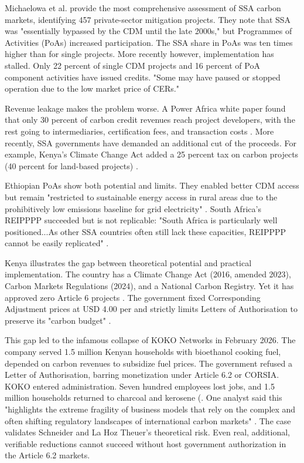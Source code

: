 Michaelowa et al. \cite{michaelowa-mobilising} provide the most comprehensive assessment of SSA carbon markets, identifying 457 private-sector mitigation projects. They note that SSA was "essentially bypassed by the CDM until the late 2000s," but Programmes of Activities (PoAs) increased participation. The SSA share in PoAs was ten times higher than for single projects. More recently however, implementation has stalled. Only 22 percent of single CDM projects and 16 percent of PoA component activities have issued credits. "Some may have paused or stopped operation due to the low market price of CERs."

Revenue leakage makes the problem worse. A Power Africa white paper found that only 30 percent of carbon credit revenues reach project developers, with the rest going to intermediaries, certification fees, and transaction costs \cite{power-africa-credits}. More recently, SSA governments have demanded an additional cut of the proceeds. For example, Kenya's Climate Change Act added a 25 percent tax on carbon projects (40 percent for land-based projects) \cite{kenya-climate-change-act}.

Ethiopian PoAs show both potential and limits. They enabled better CDM access but remain "restricted to sustainable energy access in rural areas due to the prohibitively low emissions baseline for grid electricity" \cite{michaelowa-mobilising}. South Africa's REIPPPP succeeded but is not replicable: "South Africa is particularly well positioned...As other SSA countries often still lack these capacities, REIPPPP cannot be easily replicated" \cite{michaelowa-mobilising}.

Kenya illustrates the gap between theoretical potential and practical implementation. The country has a Climate Change Act (2016, amended 2023), Carbon Markets Regulations (2024), and a National Carbon Registry. Yet it has approved zero Article 6 projects \cite{kenya-zero-approvals}. The government fixed Corresponding Adjustment prices at USD 4.00 per \tcooe and strictly limits Letters of Authorisation to preserve its "carbon budget" \cite{kenya-carbon-budget}.

This gap led to the infamous collapse of KOKO Networks in February 2026. The company served 1.5 million Kenyan households with bioethanol cooking fuel, depended on carbon revenues to subsidize fuel prices. The government refused a Letter of Authorisation, barring monetization under Article 6.2 or CORSIA. KOKO entered administration. Seven hundred employees lost jobs, and 1.5 million households returned to charcoal and kerosene (\cite{koko-disrupt,koko-econews}. One analyst said this "highlights the extreme fragility of business models that rely on the complex and often shifting regulatory landscapes of international carbon markets" \cite{koko-econews}. The case validates Schneider and La Hoz Theuer's \cite{schneider-integrity} theoretical risk. Even real, additional, verifiable reductions cannot succeed without host government authorization in the Article 6.2 markets.

